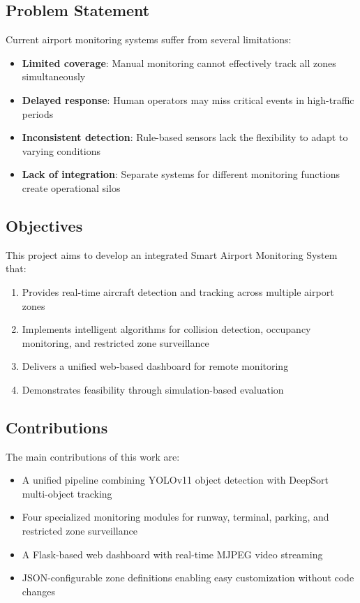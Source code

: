 \documentclass[conference]{IEEEtran}
\begin{document}
\subsection{Problem Statement}
Current airport monitoring systems suffer from several limitations:
\begin{itemize}
    \item \textbf{Limited coverage}: Manual monitoring cannot effectively track all zones simultaneously
    \item \textbf{Delayed response}: Human operators may miss critical events in high-traffic periods
    \item \textbf{Inconsistent detection}: Rule-based sensors lack the flexibility to adapt to varying conditions
    \item \textbf{Lack of integration}: Separate systems for different monitoring functions create operational silos
\end{itemize}

\subsection{Objectives}
This project aims to develop an integrated Smart Airport Monitoring System that:
\begin{enumerate}
    \item Provides real-time aircraft detection and tracking across multiple airport zones
    \item Implements intelligent algorithms for collision detection, occupancy monitoring, and restricted zone surveillance
    \item Delivers a unified web-based dashboard for remote monitoring
    \item Demonstrates feasibility through simulation-based evaluation
\end{enumerate}

\subsection{Contributions}
The main contributions of this work are:
\begin{itemize}
    \item A unified pipeline combining YOLOv11 object detection with DeepSort multi-object tracking
    \item Four specialized monitoring modules for runway, terminal, parking, and restricted zone surveillance
    \item A Flask-based web dashboard with real-time MJPEG video streaming
    \item JSON-configurable zone definitions enabling easy customization without code changes
\end{itemize}
\end{document}
